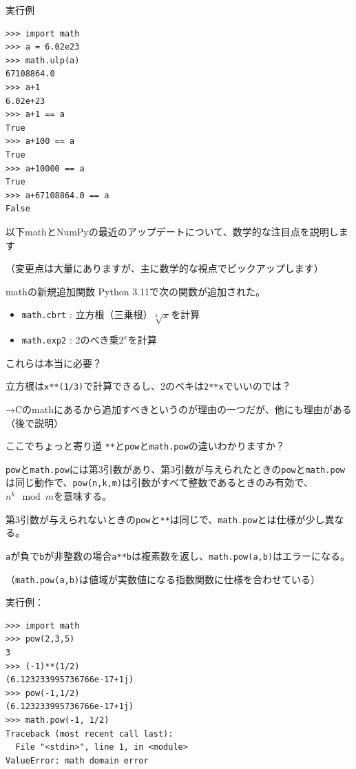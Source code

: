 \documentclass[unicode,lualatex,aspectratio=169]{beamer}
\begin{document}
\begin{frame}[fragile]
実行例
{\fontsize{8pt}{8pt}\selectfont
\begin{verbatim}
>>> import math
>>> a = 6.02e23
>>> math.ulp(a)
67108864.0
>>> a+1
6.02e+23
>>> a+1 == a
True
>>> a+100 == a
True
>>> a+10000 == a
True
>>> a+67108864.0 == a
False
\end{verbatim}
}
\end{frame}
\begin{frame}[fragile]
  以下mathとNumPyの最近のアップデートについて、数学的な注目点を説明します
  
  （変更点は大量にありますが、主に数学的な視点でピックアップします）
\end{frame}
\begin{frame}[fragile]{mathの新規追加関数}
  Python 3.11で次の関数が追加された。
  \begin{itemize}
  \item \verb|math.cbrt| : 立方根（三乗根）$\sqrt[3]{x}$を計算
  \item \verb|math.exp2| : 2のべき乗$2^x$を計算
  \end{itemize}
  これらは本当に必要？

  立方根は\verb|x**(1/3)|で計算できるし、2のベキは\verb|2**x|でいいのでは？

  →Cのmathにあるから追加すべきというのが理由の一つだが、他にも理由がある（後で説明）
\end{frame}
\begin{frame}[fragile]{ここでちょっと寄り道}
  \verb|**|と\verb|pow|と\verb|math.pow|の違いわかりますか？\vspace{7mm}

  
  \verb|pow|と\verb|math.pow|には第3引数があり、第3引数が与えられたときの\verb|pow|と\verb|math.pow|は同じ動作で、\verb|pow(n,k,m)|は引数がすべて整数であるときのみ有効で、$n^k \mod m$を意味する。

  第3引数が与えられないときの\verb|pow|と\verb|**|は同じで、\verb|math.pow|とは仕様が少し異なる。

  \verb|a|が負で\verb|b|が非整数の場合\verb|a**b|は複素数を返し、\verb|math.pow(a,b)|はエラーになる。

  （\verb|math.pow(a,b)|は値域が実数値になる指数関数に仕様を合わせている）
\end{frame}
\begin{frame}[fragile]
  実行例：
\fontsize{8pt}{8pt}\selectfont
\begin{verbatim}
>>> import math
>>> pow(2,3,5)
3
>>> (-1)**(1/2)
(6.123233995736766e-17+1j)
>>> pow(-1,1/2)
(6.123233995736766e-17+1j)
>>> math.pow(-1, 1/2)
Traceback (most recent call last):
  File "<stdin>", line 1, in <module>
ValueError: math domain error
\end{verbatim}
\end{frame}
\end{document}
